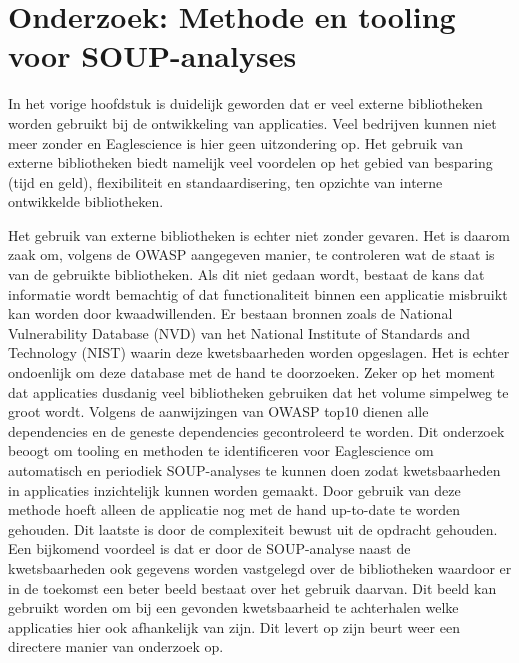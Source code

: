 \chapter{Onderzoek: Methode en tooling voor SOUP-analyses}\label{ch:onderzoek-tool-methode}
In het vorige hoofdstuk is duidelijk geworden dat er veel externe bibliotheken worden gebruikt bij de ontwikkeling van applicaties. Veel bedrijven kunnen niet meer zonder en Eaglescience is hier geen uitzondering op. Het gebruik van externe bibliotheken biedt namelijk veel voordelen op het gebied van besparing (tijd en geld), flexibiliteit en standaardisering, ten opzichte van interne ontwikkelde bibliotheken.

Het gebruik van externe bibliotheken is echter niet zonder gevaren. Het is daarom zaak om, volgens de OWASP aangegeven manier, te controleren wat de staat is van de gebruikte bibliotheken. Als dit niet gedaan wordt, bestaat de kans dat informatie wordt bemachtig of dat functionaliteit binnen een applicatie misbruikt kan worden door kwaadwillenden. Er bestaan bronnen zoals de National Vulnerability Database (NVD) van het National Institute of Standards and Technology (NIST) waarin deze kwetsbaarheden worden opgeslagen. Het is echter ondoenlijk om deze database met de hand te doorzoeken. Zeker op het moment dat applicaties dusdanig veel bibliotheken gebruiken dat het volume simpelweg te groot wordt. Volgens de aanwijzingen van OWASP top10 dienen alle dependencies en de geneste dependencies gecontroleerd te worden.
Dit onderzoek beoogt om tooling en methoden te identificeren voor Eaglescience om automatisch en periodiek SOUP-analyses te kunnen doen zodat kwetsbaarheden in applicaties inzichtelijk kunnen worden gemaakt. Door gebruik van deze methode hoeft alleen de applicatie nog met de hand up-to-date te worden gehouden. Dit laatste is door de complexiteit bewust uit de opdracht gehouden. Een bijkomend voordeel is dat er door de SOUP-analyse naast de kwetsbaarheden ook gegevens worden vastgelegd over de bibliotheken waardoor er in de toekomst een beter beeld bestaat over het gebruik daarvan. Dit beeld kan gebruikt worden om bij een gevonden kwetsbaarheid te achterhalen welke applicaties hier ook afhankelijk van zijn. Dit levert op zijn beurt weer een directere manier van onderzoek op.

